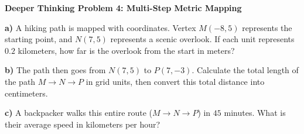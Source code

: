 \documentclass[12pt, letterpaper, fleqn]{article}
\begin{document}
\vspace{4mm}

\begin{tcolorbox}[colback=white, colframe=black, boxrule=1pt, arc=4mm, left=6mm, right=6mm, top=5mm, bottom=5mm]
\textbf{Deeper Thinking Problem 4: Multi-Step Metric Mapping}

\medskip
\noindent
\textbf{a)} A hiking path is mapped with coordinates. Vertex $M(-8, 5)$ represents the starting point, and $N(7, 5)$ represents a scenic overlook. If each unit represents $0.2$ kilometers, how far is the overlook from the start in meters?
\vspace{5cm}

\noindent
\textbf{b)} The path then goes from $N(7, 5)$ to $P(7, -3)$. Calculate the total length of the path $M \rightarrow N \rightarrow P$ in grid units, then convert this total distance into centimeters.
\vspace{5cm}

\noindent
\textbf{c)} A backpacker walks this entire route ($M \rightarrow N \rightarrow P$) in $45$ minutes. What is their average speed in kilometers per hour?
\vspace{5cm}
\end{tcolorbox}
\end{document}
